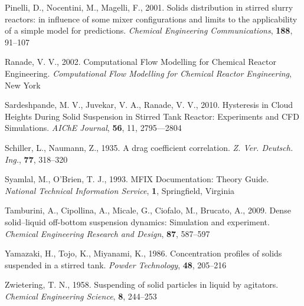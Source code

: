 \begin{thebibliography}{99}
 Pinelli, D., Nocentini, M., Magelli, F., 2001. Solids distribution in stirred slurry reactors: in influence of some mixer configurations and limits to the applicability of a simple model for predictions.
\textit{Chemical Engineering Communications}, \textbf{188}, 91--107

 Ranade, V. V., 2002. Computational Flow Modelling for Chemical Reactor Engineering. \textit{Computational Flow Modelling for Chemical Reactor Engineering}, New York

 Sardeshpande, M. V., Juvekar, V. A., Ranade, V. V., 2010. Hysteresis in Cloud Heights During Solid Suspension in Stirred Tank Reactor: Experiments and CFD Simulations. \textit{AIChE Journal}, \textbf{56}, 11, 2795---2804

 Schiller, L., Naumann, Z., 1935. A drag coefficient correlation. \textit{Z. Ver. Deutsch. Ing.}, \textbf{77}, 318--320

 Syamlal, M., O'Brien, T. J., 1993. MFIX Documentation: Theory Guide. \textit{National Technical Information Service}, \textbf{1}, Springfield, Virginia 

 Tamburini, A., Cipollina, A., Micale, G., Ciofalo, M., Brucato, A., 2009. Dense solid–liquid off-bottom suspension dynamics: Simulation and experiment. \textit{Chemical Engineering Research and Design}, \textbf{87}, 587--597

 Yamazaki, H., Tojo, K., Miyanami, K., 1986. Concentration profiles of solids suspended in a stirred tank. \textit{Powder Technology}, \textbf{48}, 205--216

 Zwietering, T. N., 1958. Suspending of solid particles in liquid by agitators. \textit{Chemical Engineering Science}, \textbf{8}, 244--253 

\end{thebibliography}

